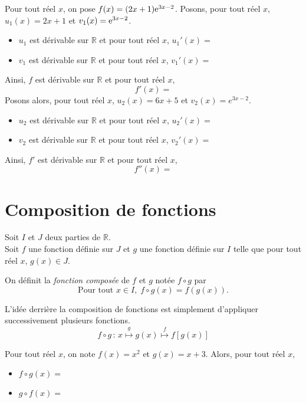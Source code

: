 \documentclass[11pt,fleqn, openany]{book} %
\begin{document}
\begin{example}Pour tout réel $x$, on pose $f(x)=(2x+1)\mathrm{e}^{3x-2}$. Posons, pour tout réel $x$, $u_1(x)=2x+1$ et $v_1(x)=\mathrm{e}^{3x-2}$.
\begin{itemize}
\item $u_1$ est dérivable sur $\mathbb{R}$ et pour tout réel $x$, $u_1'(x)=$
\item $v_1$ est dérivable sur $\mathbb{R}$ et pour tout réel $x$, $v_1'(x)=$
\end{itemize}
Ainsi, $f$ est dérivable sur $\mathbb{R}$ et pour tout réel $x$,
\[ f'(x)=\]
Posons alors, pour tout réel $x$, $u_2(x)=6x+5$ et $v_2(x)=e^{3x-2}$.
\begin{itemize}
\item $u_2$ est dérivable sur $\mathbb{R}$ et pour tout réel $x$, $u_2'(x)=$
\item $v_2$ est dérivable sur $\mathbb{R}$ et pour tout réel $x$, $v_2'(x)=$
\end{itemize}
Ainsi, $f'$ est dérivable sur $\mathbb{R}$ et pour tout réel $x$,
\[ f''(x)=\]
\end{example}



\section{Composition de fonctions}


\begin{definition}  Soit $I$ et $J$ deux parties de $\mathbb{R}$.\\ Soit $f$ une fonction définie sur $J$ et $g$ une fonction définie sur $I$ telle que pour tout réel $x$, $g(x) \in J$.

On définit la \textit{fonction composée} de $f$ et $g$ notée $f \circ g$ par 
\[ \text{Pour tout } x \in I, \; f \circ g (x)= f(g(x)).\]\end{definition}
 L'idée derrière la composition de fonctions est simplement d'appliquer successivement plusieurs fonctions.
 \[f \circ g \,:\, x \overset{g}{\longmapsto} g(x) \overset{f}{\longmapsto} f[g(x)]\]

\begin{example} Pour tout réel $x$, on note $f(x)=x^2$ et $g(x)=x+3$. Alors, pour tout réel $x$,
\begin{itemize}
\item $f \circ g (x)= $
\item $g \circ f(x)=$
\end{itemize}\end{example}
\end{document}
